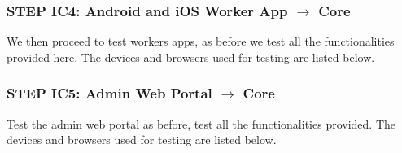 \subsubsection{STEP IC4: Android and iOS Worker App $\rightarrow$ Core}
We then proceed to test workers apps, as before we test all the functionalities provided here. The devices and browsers used for testing are listed below.

\subsubsection{STEP IC5: Admin Web Portal $\rightarrow$ Core}
Test the admin web portal as before, test all the functionalities provided. The devices and browsers used for testing are listed below.

